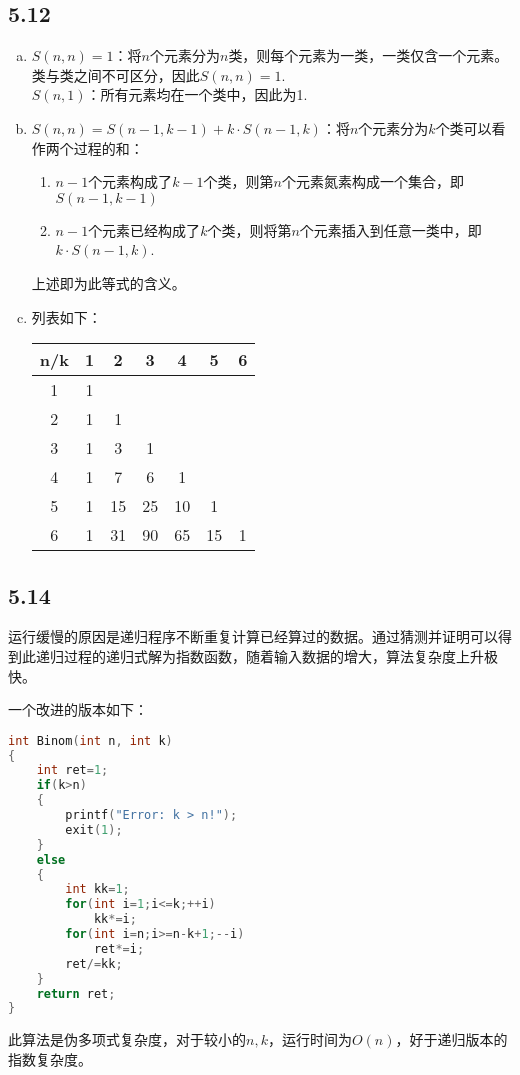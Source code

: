 \documentclass[twocolumn]{article}
\begin{document}
	\subsection*{5.12}
	\begin{enumerate}[(a)]
		\item $S(n,n)=1$：将$n$个元素分为$n$类，则每个元素为一类，一类仅含一个元素。类与类之间不可区分，因此$S(n,n)=1$.\\
		$S(n,1)$：所有元素均在一个类中，因此为1.
		\item $S(n,n)=S(n-1,k-1)+k\cdot S(n-1,k)$：将$n$个元素分为$k$个类可以看作两个过程的和：
		\begin{enumerate}[1.]
			\item $n-1$个元素构成了$k-1$个类，则第$n$个元素氮素构成一个集合，即$S(n-1,k-1)$
			\item $n-1$个元素已经构成了$k$个类，则将第$n$个元素插入到任意一类中，即$k\cdot S(n-1,k)$.
		\end{enumerate}
	上述即为此等式的含义。
	\item 列表如下：
	\begin{table}[H]
		\centering
		\begin{tabular}{c|c|c|c|c|c|c}
			n/k & 1  & 2  & 3  & 4  & 5  & 6  \\ \hline
			1   & 1  &   &  &  &  &  \\ \hline
			2   & 1 &  1 &  &  &  &  \\ \hline
			3   & 1 & 3 & 1 &  &  &  \\ \hline
			4   & 1 & 7 & 6 & 1 &  &  \\ \hline
			5   & 1 & 15 & 25 & 10 & 1 &  \\ \hline
			6   & 1 & 31 & 90 & 65 & 15 & 1
		\end{tabular}
	\end{table}
	\end{enumerate}
	\subsection*{5.14}
	运行缓慢的原因是递归程序不断重复计算已经算过的数据。通过猜测并证明可以得到此递归过程的递归式解为指数函数，随着输入数据的增大，算法复杂度上升极快。\par 
	一个改进的版本如下：
	\begin{lstlisting}[language=C]
int Binom(int n, int k)
{
    int ret=1;
    if(k>n)
    {    
        printf("Error: k > n!");
        exit(1);
    }
    else
    {
        int kk=1;
        for(int i=1;i<=k;++i)
            kk*=i;
        for(int i=n;i>=n-k+1;--i)
            ret*=i;
        ret/=kk;
    }
    return ret;
}
	\end{lstlisting}
	此算法是伪多项式复杂度，对于较小的$n,k$，运行时间为$O(n)$，好于递归版本的指数复杂度。
\end{document}
